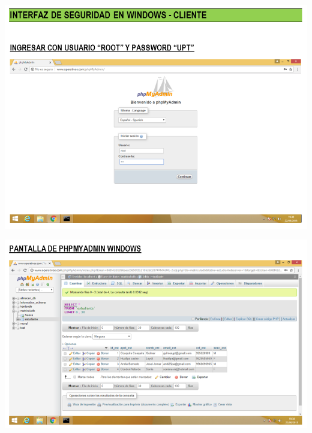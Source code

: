 \begin{itemize}
		\begin{center}
		\includegraphics[width=15cm]{./Imagenes/l}
		\end{center}
\end{itemize}

\begin{itemize}
		\begin{center}
		\includegraphics[width=15cm]{./Imagenes/m}
		\end{center}
\end{itemize}

